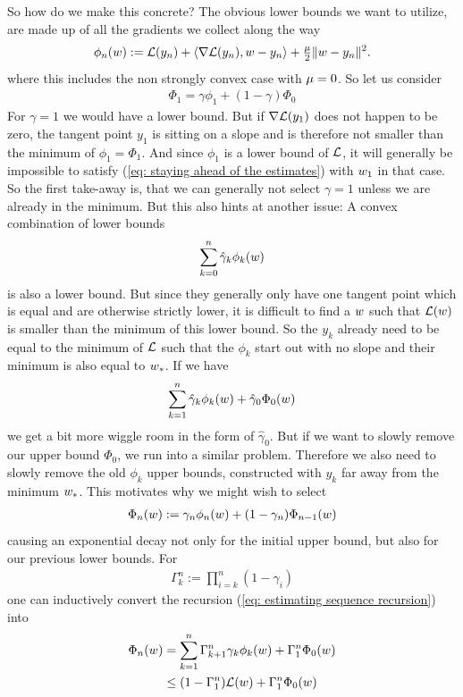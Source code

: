 So how do we make this concrete?
The obvious lower bounds we want to utilize, are made up of all the gradients we
collect along the way
\begin{align*}
	\phi_n(w)
	:= \mathcal{L}(y_n) + \langle\nabla\mathcal{L}(y_n), w-y_n\rangle
	+ \tfrac{\mu}{2}\|w-y_n\|^2.
\end{align*}
where this includes the non strongly convex case with \(\mu=0\). So let
us consider
\begin{align*}
	\Phi_1 = \gamma \phi_1 + (1-\gamma)\Phi_0
\end{align*}
For \(\gamma=1\) we would have a lower bound. But if \(\nabla\mathcal{L}(y_1)\)
does not happen to be zero, the tangent point \(y_1\) is sitting on a slope and
is therefore not smaller than the minimum of \(\phi_1=\Phi_1\). And since
\(\phi_1\) is a lower bound of \(\mathcal{L}\), it will generally be impossible to
satisfy (\ref{eq: staying ahead of the estimates}) with \(w_1\) in that
case.
So the first take-away is, that we can generally not select \(\gamma=1\)
unless we are already in the minimum. But this also hints at another issue:
A convex combination of lower bounds
\begin{align*}
	\sum_{k=0}^n \hat{\gamma}_k \phi_k(w)
\end{align*}
is also a lower bound. But since they generally only have one tangent point
which is equal and are otherwise strictly lower, it is difficult to find
a \(w\) such that \(\mathcal{L}(w)\) is smaller than the minimum of this
lower bound. So the \(y_k\) already need to be equal to the minimum
of \(\mathcal{L}\) such that the \(\phi_k\) start out with no slope and their
minimum is also equal to \(w_*\). If we have
\begin{align*}
	\sum_{k=1}^n \hat{\gamma}_k \phi_k(w)
	+ \hat{\gamma}_0 \Phi_0(w)
\end{align*}
we get a bit more wiggle room in the form of \(\hat{\gamma}_0\). But if we want
to slowly remove our upper bound \(\Phi_0\), we run into a similar problem. Therefore we
also need to slowly remove the old
\(\phi_k\) upper bounds, constructed with \(y_k\) far away from the minimum
\(w_*\). This motivates why we might wish to select
\begin{align}\label{eq: estimating sequence recursion}
	\Phi_n(w) := \gamma_n \phi_n(w) + (1-\gamma_n)\Phi_{n-1}(w)
\end{align}
causing an exponential decay not only for the initial upper bound, but also for
our previous lower bounds. For
\begin{align*}
	\Gamma_k^n := \prod_{i=k}^n (1-\gamma_i)
\end{align*}
one can inductively convert the recursion (\ref{eq: estimating sequence
recursion}) into
\begin{align}
	\nonumber
	\Phi_n(w)
	&= \sum_{k=1}^n \Gamma_{k+1}^n\gamma_k \phi_k(w)
	+ \Gamma_1^n\Phi_0(w) \\
	\label{eq: estimating sequence explicit}
	&\le (1-\Gamma_1^n)\mathcal{L}(w) + \Gamma_1^n\Phi_0(w)
\end{align}

